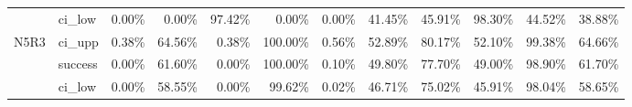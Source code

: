 \begin{tabular}{llrrrrrrrrrr}
     & ci\_low &       0.00\% &   0.00\% &  97.42\% &   0.00\% &   0.00\% &       41.45\% & 45.91\% & 98.30\% & 44.52\% & 38.88\% \\
N5R3 & ci\_upp &       0.38\% &  64.56\% &   0.38\% & 100.00\% &   0.56\% &       52.89\% & 80.17\% & 52.10\% & 99.38\% & 64.66\% \\
     & success &       0.00\% &  61.60\% &   0.00\% & 100.00\% &   0.10\% &       49.80\% & 77.70\% & 49.00\% & 98.90\% & 61.70\% \\
     & ci\_low &       0.00\% &  58.55\% &   0.00\% &  99.62\% &   0.02\% &       46.71\% & 75.02\% & 45.91\% & 98.04\% & 58.65\% \\
\bottomrule
\end{tabular}

